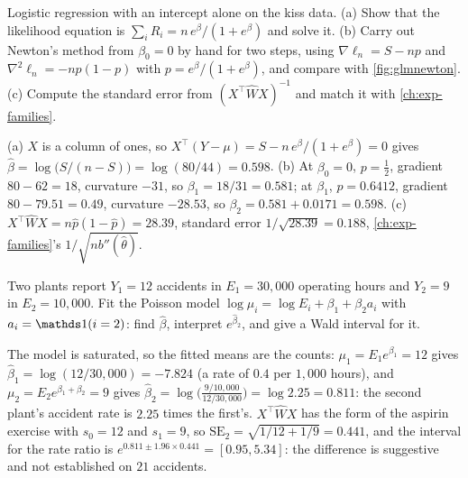 \begin{exercise}
\label{ex:glm-kiss-newton}
Logistic regression with an intercept alone on the kiss data. (a) Show that the likelihood equation is $\sum_i R_i = n\,e^\beta/(1 + e^\beta)$ and solve it. (b) Carry out Newton's method from $\beta_0 = 0$ by hand for two steps, using $\nabla\ell_n = S - np$ and $\nabla^2\ell_n = -np(1 - p)$ with $p = e^\beta/(1 + e^\beta)$, and compare with \cref{fig:glmnewton}. (c) Compute the standard error from $(X^\top\hat{W}X)^{-1}$ and match it with \cref{ch:exp-families}.
\end{exercise}
\begin{solution}
(a) $X$ is a column of ones, so $X^\top(Y - \mu) = S - n\,e^\beta/(1 + e^\beta) = 0$ gives $\hat{\beta} = \log\big(S/(n - S)\big) = \log(80/44) = 0.598$. (b) At $\beta_0 = 0$, $p = \frac12$, gradient $80 - 62 = 18$, curvature $-31$, so $\beta_1 = 18/31 = 0.581$; at $\beta_1$, $p = 0.6412$, gradient $80 - 79.51 = 0.49$, curvature $-28.53$, so $\beta_2 = 0.581 + 0.0171 = 0.598$. (c) $X^\top\hat{W}X = n\hat{p}(1 - \hat{p}) = 28.39$, standard error $1/\sqrt{28.39} = 0.188$, \cref{ch:exp-families}'s $1/\sqrt{nb''(\hat{\theta})}$.
\end{solution}

\begin{exercise}
\label{ex:glm-offset}
Two plants report $Y_1 = 12$ accidents in $E_1 = 30{,}000$ operating hours and $Y_2 = 9$ in $E_2 = 10{,}000$. Fit the Poisson model $\log\mu_i = \log E_i + \beta_1 + \beta_2a_i$ with $a_i = \ind(i = 2)$: find $\hat{\beta}$, interpret $e^{\hat{\beta}_2}$, and give a Wald interval for it.
\end{exercise}
\begin{solution}
The model is saturated, so the fitted means are the counts: $\mu_1 = E_1e^{\beta_1} = 12$ gives $\hat{\beta}_1 = \log(12/30{,}000) = -7.824$ (a rate of $0.4$ per $1{,}000$ hours), and $\mu_2 = E_2e^{\beta_1 + \beta_2} = 9$ gives $\hat{\beta}_2 = \log\big(\frac{9/10{,}000}{12/30{,}000}\big) = \log 2.25 = 0.811$: the second plant's accident rate is $2.25$ times the first's. $X^\top\hat{W}X$ has the form of the aspirin exercise with $s_0 = 12$ and $s_1 = 9$, so $\mathrm{SE}_2 = \sqrt{1/12 + 1/9} = 0.441$, and the interval for the rate ratio is $e^{0.811 \pm 1.96 \times 0.441} = [0.95, 5.34]$: the difference is suggestive and not established on $21$ accidents.
\end{solution}
